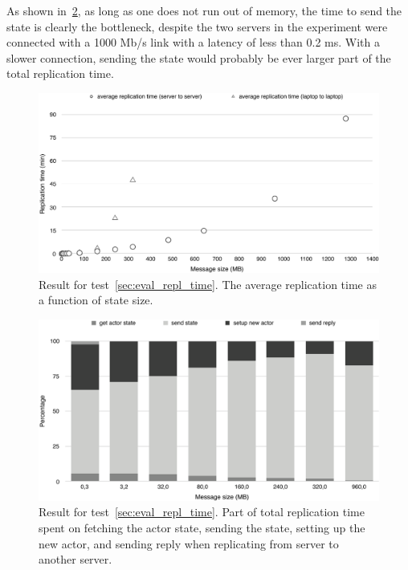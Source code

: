 \documentclass{cslthse-msc}
\begin{document}
As shown in~\cref{fig:replication_time_percentages_server}, as long as one does not run out of memory, the time to send the state is clearly the bottleneck, despite the two servers in the experiment were connected with a 1000 Mb/s link with a latency of less than 0.2 ms. With a slower connection, sending the state would probably be ever larger part of the total replication time.


\begin{figure}[!hbt]
\centering
\includegraphics[scale=0.5]{images/results/replication_time.pdf} 
\caption{Result for test~\ref{sec:eval_repl_time}. The average replication time as a function of state size.}\label{fig:replication_time}
\end{figure}

\begin{figure}[!hbt]
\centering
\includegraphics[scale=0.5]{images/results/replication_time_percentages_server.pdf} 
\caption{Result for test~\ref{sec:eval_repl_time}. Part of total replication time spent on fetching the actor state, sending the state, setting up the new actor, and sending reply when replicating from server to another server.}\label{fig:replication_time_percentages_server}
\end{figure}
\end{document}
